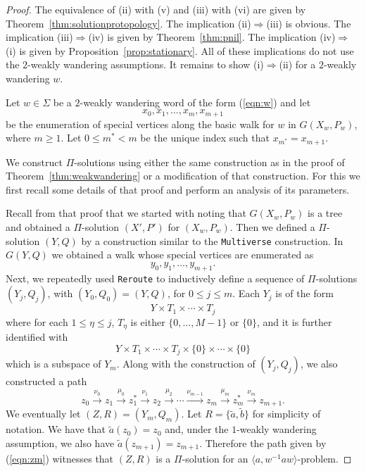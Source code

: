 \documentclass[11pt]{amsart}
\theoremstyle{definition}
\theoremstyle{definition}
\numberwithin{equation}{section}
\begin{document}
\begin{proof} The equivalence of (ii) with (v) and (iii) with (vi) are given by Theorem~\ref{thm:solutionprotopology}. The implication (ii)$\Rightarrow$(iii)  is obvious. The implication (iii)$\Rightarrow$(iv) is given by Theorem~\ref{thm:pnil}. The implication (iv)$\Rightarrow$(i) is given by Proposition~\ref{prop:stationary}. All of these implications do not use the $2$-weakly wandering assumptions. It remains to show (i)$\Rightarrow$(ii) for a $2$-weakly wandering $w$.


Let $w\in \Sigma$ be a $2$-weakly wandering word of the form (\ref{eqn:w}) and let
$$ x_0, x_1, \dots, x_m, x_{m+1} $$
be the enumeration of special vertices along the basic walk for $w$ in $G(X_w, P_w)$, where $m\geq 1$. Let $0\leq m^*<m$ be the unique index such that $x_{m^*}=x_{m+1}$. 

We construct $\Pi$-solutions using either the same construction as in the proof of Theorem~\ref{thm:weakwandering} or a modification of that construction.  For this we first recall some details of that proof and perform an analysis of its parameters. 

Recall from that proof that we started with noting that $G(X_w, P_w)$ is a tree and obtained a $\Pi$-solution $(X', P')$ for $(X_w, P_w)$. Then we defined a $\Pi$-solution $(Y, Q)$ by a construction similar to the {\tt Multiverse} construction. In $G(Y, Q)$ we obtained a walk whose special vertices are enumerated as
$$ y_0, y_1, \dots, y_{m+1}. $$
Next, we repeatedly used {\tt Reroute} to inductively define a sequence of $\Pi$-solutions $(Y_j, Q_j)$, with $(Y_0, Q_0)=(Y, Q)$, for $0\leq j\leq m$. Each $Y_j$ is of the form
$$ Y\times T_1\times\cdots \times T_j$$
where for each $1\leq \eta\leq j$, $T_\eta$ is either $\{0, \dots, M-1\}$ or $\{0\}$, and it is further identified with 
$$ Y\times T_1\times \cdots\times T_j\times\{0\}\times\cdots \times\{0\} $$
which is a subspace of $Y_m$. Along with the construction of $(Y_j, Q_j)$, we also constructed a path
\begin{equation}\label{eqn:zm} z_0\stackrel{\nu_0}{\longrightarrow} z_1\stackrel{\mu_0}{\longrightarrow} z_1^*\stackrel{\nu_1}{\longrightarrow} z_2\stackrel{\mu_2}{\longrightarrow}\cdots\stackrel{\nu_{m-1}}{\longrightarrow}z_m\stackrel{\mu_m}{\longrightarrow}z_m^*\stackrel{\nu_m}{\longrightarrow}z_{m+1}. 
\end{equation}
We eventually let $(Z, R)=(Y_m, Q_m)$. Let $R=\{\tilde{a}, \tilde{b}\}$ for simplicity of notation. We have that $\tilde{a}(z_0)=z_0$ and, under the $1$-weakly wandering assumption, we also have $\tilde{a}(z_{m+1})=z_{m+1}$. Therefore the path given by (\ref{eqn:zm}) witnesses that $(Z, R)$ is a $\Pi$-solution for an $\langle a, w^{-1}aw\rangle$-problem.


\end{proof}
\end{document}
